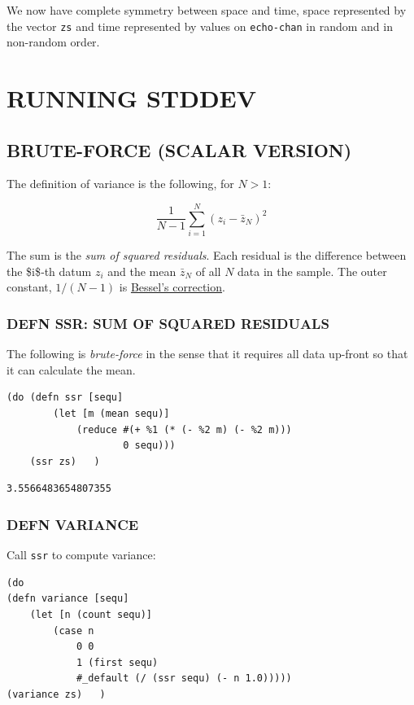\documentclass[10pt,oneside,x11names]{article}
\begin{document}
We now have complete symmetry between space and time, space represented by the
vector \texttt{zs} and time represented by values on \texttt{echo-chan} in random and in
non-random order.

\section{RUNNING STDDEV}
\label{running-stddev}
\subsection{BRUTE-FORCE (SCALAR VERSION)}
\label{brute-force-scalar-version}
The definition of variance is the following, for \(N>1\):

$$\frac{1}{N-1}\sum\limits_{i=1}^{N}\left({z_i-\bar{z}_N}\right)^2$$

The sum is the \emph{sum of squared residuals}. Each residual is the difference
between the \$i\$‑th datum \(z_i\) and the mean \(\bar{z}_N\) of all \(N\) data in the
sample. The outer constant, \(1/(N-1)\) is \href{https://en.wikipedia.org/wiki/Bessel's\_correction}{Bessel's correction}.

\subsubsection{DEFN SSR: SUM OF SQUARED RESIDUALS}
\label{ssr-sum-of-squared-residuals}
The following is \emph{brute-force} in the sense that it requires all data
up-front so that it can calculate the mean.

\begin{verbatim}
(do (defn ssr [sequ]
        (let [m (mean sequ)]
            (reduce #(+ %1 (* (- %2 m) (- %2 m)))
                    0 sequ)))
    (ssr zs)   )
\end{verbatim}

\begin{verbatim}
3.5566483654807355
\end{verbatim}

\subsubsection{DEFN VARIANCE}
\label{variance}
Call \texttt{ssr} to compute variance:

\begin{verbatim}
(do
(defn variance [sequ]
    (let [n (count sequ)]
        (case n
            0 0
            1 (first sequ)
            #_default (/ (ssr sequ) (- n 1.0)))))
(variance zs)   )
\end{verbatim}
\end{document}
